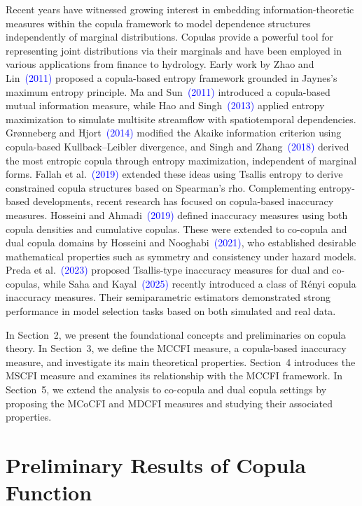 \documentclass[12pt, a4paper]{article}
\numberwithin{equation}{section}
\begin{document}
Recent years have witnessed growing interest in embedding information-theoretic measures within the copula framework to model dependence structures independently of marginal distributions. Copulas provide a powerful tool for representing joint distributions via their marginals and have been employed in various applications from finance to hydrology. Early work by Zhao and Lin~\textcolor{blue}{(2011)} proposed a copula-based entropy framework grounded in Jaynes’s maximum entropy principle. Ma and Sun~\textcolor{blue}{(2011)} introduced a copula-based mutual information measure, while Hao and Singh~\textcolor{blue}{(2013)} applied entropy maximization to simulate multisite streamflow with spatiotemporal dependencies.
Grønneberg and Hjort~\textcolor{blue}{(2014)} modified the Akaike information criterion using copula-based Kullback–Leibler divergence, and Singh and Zhang~\textcolor{blue}{(2018)} derived the most entropic copula through entropy maximization, independent of marginal forms. Fallah et al.~\textcolor{blue}{(2019)} extended these ideas using Tsallis entropy to derive constrained copula structures based on Spearman’s rho.
Complementing entropy-based developments, recent research has focused on copula-based inaccuracy measures. Hosseini and Ahmadi~\textcolor{blue}{(2019)} defined inaccuracy measures using both copula densities and cumulative copulas. These were extended to co-copula and dual copula domains by Hosseini and Nooghabi~\textcolor{blue}{(2021)}, who established desirable mathematical properties such as symmetry and consistency under hazard models. Preda et al.~\textcolor{blue}{(2023)} proposed Tsallis-type inaccuracy measures for dual and co-copulas, while Saha and Kayal~\textcolor{blue}{(2025)} recently introduced a class of Rényi  copula inaccuracy measures. Their semiparametric estimators demonstrated strong performance in model selection tasks based on both simulated and real data.

In Section~2, we present the foundational concepts and preliminaries on copula theory. In Section~3, we define the MCCFI measure, a copula-based inaccuracy measure, and investigate its main theoretical properties. Section~4 introduces the MSCFI measure and examines its relationship with the MCCFI framework. In Section~5, we extend the analysis to co-copula and dual copula settings by proposing the MCoCFI and MDCFI measures and studying their associated properties.
\section{Preliminary Results of Copula Function}\label{sec2}
\end{document}
